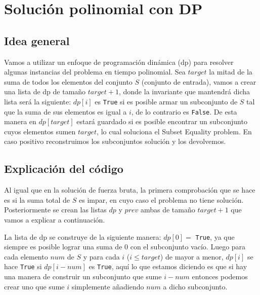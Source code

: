 \documentclass[11pt]{article}
\begin{document}
    \section{Solución polinomial con DP}

    \subsection{Idea general}
    Vamos a utilizar un enfoque de programación dinámica (dp) para resolver algunas instancias del problema en tiempo polinomial.
    Sea $target$ la mitad de la suma de todos los elementos del conjunto $S$ (conjunto de entrada), vamos a crear una lista de dp
    de tamaño $target + 1$, donde la invariante que mantendrá dicha lista será la siguiente: $dp[i]$ es \texttt{True} si es posible
    armar un subconjunto de $S$ tal que la suma de sus elementos es igual a $i$, de lo contrario es \texttt{False}. De esta manera en
    $dp[target]$ estará guardado si es posible encontrar un subconjunto cuyos elementos sumen $target$, lo cual soluciona el Subset
    Equality problem. En caso positivo reconstruimos los subconjuntos solución y los devolvemos.

    \subsection{Explicación del código}
    Al igual que en la solución de fuerza bruta, la primera comprobación que se hace es si la suma total de $S$ es impar, en cuyo
    caso el problema no tiene solución. Posteriormente se crean las listas $dp$ y $prev$ ambas de tamaño $target+1$ que vamos a 
    explicar a continuación.

    La lista de dp se construye de la siguiente manera: $dp[0] =$ \texttt{True}, ya que siempre es posible lograr una suma de 0 con el
    subconjunto vacío. Luego para cada elemento $num$ de $S$ y para cada $i$ ($i \leq target$) de mayor a menor, $dp[i]$ se hace \texttt{True} si 
    $dp[i - num]$ es \texttt{True}, aquí lo que estamos diciendo es que si hay una manera de construir un subconjunto que sume $i - num$ 
    entonces podemos crear uno que sume $i$ simplemente añadiendo $num$ a dicho subconjunto.
\end{document}
